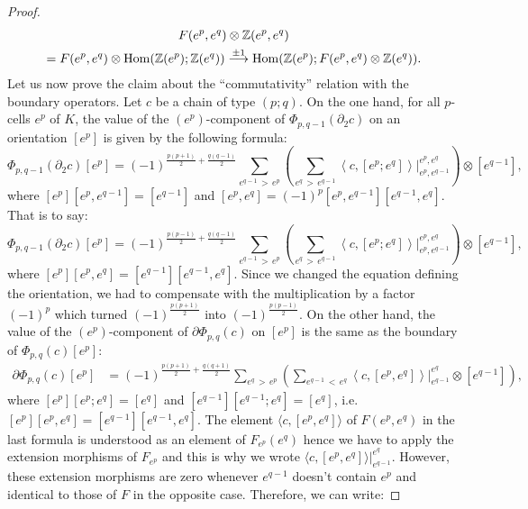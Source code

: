 \documentclass[AHL,Unicode,longabstracts,published]{cedram}
\newcommand{\arr}{\buildrel{\pm 1}\over{\longrightarrow}}
\newcommand{\Z}{\mathbb{Z}}
\DeclareMathOperator{\Hom}{Hom}
\begin{document}
\begin{proof}
\begin{multline*}
F(e^p,e^q)\otimes \Z(e^p,e^q)\\
=
 F(e^p,e^q)\otimes \Hom(\Z(e^p);\Z(e^q))
\arr\Hom(\Z(e^p);F(e^p,e^q)\otimes\Z(e^q)).
\end{multline*}
Let us now prove the claim about the ``commutativity'' relation with the boundary operators. Let $c$ be a chain of type $(p;q)$. On the one hand, for all $p$-cells $e^p$ of $K$, the value of the $(e^p)$-component of $\Phi_{p,q-1}(\partial_2 c)$ on an orientation $[e^p]$ is given by the following formula:
\begin{equation*}
\Phi_{p,q-1}(\partial_2c)[e^p]=(-1)^{\frac{p(p+1)}{2}+\frac{q(q-1)}{2}}\sum_{e^{q-1}\,>\,e^p}\left(\sum_{e^q\,>\,e^{q-1}} \left\langle c, [e^p;e^q]\right\rangle \Big|^{e^p,e^q}_{e^p,e^{q-1}}\right)\otimes\left[e^{q-1}\right],
\end{equation*}
where $[e^p][e^p,e^{q-1}]=[e^{q-1}]$ and $[e^p,e^q]=(-1)^p[e^p,e^{q-1}][e^{q-1},e^q]$. That is to say:
\begin{equation*}
\Phi_{p,q-1}(\partial_2c)[e^p]=(-1)^{\frac{p(p-1)}{2}+\frac{q(q-1)}{2}}\sum_{e^{q-1}\,>\,e^p}\left(\sum_{e^q\,>\,e^{q-1}} \left\langle c, [e^p;e^q]\right\rangle \Big|^{e^p,e^q}_{e^p,e^{q-1}}\right)\otimes\left[e^{q-1}\right],
\end{equation*}
where $[e^p][e^p,e^q]=[e^{q-1}][e^{q-1},e^q]$. Since we changed the equation defining the orientation, we had to compensate with the multiplication by a factor $(-1)^p$ which turned $(-1)^{\frac{p(p+1)}{2}}$ into $(-1)^{\frac{p(p-1)}{2}}$. On the other hand, the value of the $(e^p)$-component of $\partial\Phi_{p,q}(c)$ on $[e^p]$ is the same as the boundary of $\Phi_{p,q}(c)[e^p]$:
\begin{align*}
\partial\Phi_{p,q}(c)[e^p] & =(-1)^{\frac{p(p+1)}{2}+\frac{q(q+1)}{2}} \sum_{e^q\,>\,e^p} \left(\sum_{e^{q-1}\,<\,e^q} \left\langle c,[e^p,e^q]\right\rangle \Big|^{e^q}_{e^{q-1}}\otimes\left[e^{q-1}\right] \right),
\end{align*}
where $[e^p][e^p;e^q]=[e^q]$ and $[e^{q-1}][e^{q-1};e^q]=[e^q]$, i.e. $[e^p][e^p,e^q]=[e^{q-1}][e^{q-1},e^q]$. The element $\langle c,[e^p,e^q]\rangle$ of $F(e^p,e^q)$ in the last formula is understood as an element of $F_{e^p}(e^q)$ hence we have to apply the extension morphisms of $F_{e^p}$ and this is why we wrote $\langle c,[e^p,e^q]\rangle |^{e^q}_{e^{q-1}}$. However, these extension morphisms are zero whenever $e^{q-1}$ doesn't contain $e^p$ and identical to those of $F$ in the opposite case. Therefore, we can write:

\end{proof}
\end{document}
